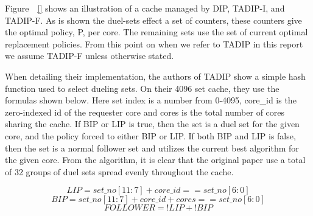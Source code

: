 
Figure~\todo{}~\ref{} shows an illustration of a cache managed by DIP, TADIP-I, and TADIP-F. 
As is shown the duel-sets effect a set of counters, these counters give the optimal policy, P, per core. 
The remaining sets use the set of current optimal replacement policies.
From this point on when we refer to TADIP in this report we assume TADIP-F unless otherwise stated.

When detailing their implementation, the authors of TADIP show a simple hash function used to select dueling sets.
On their 4096 set cache, they use the formulas shown below.
Here set index is a number from 0-4095, core\_id is the zero-indexed id of the requester core and cores is the total number of cores sharing the cache.
If BIP or LIP is true, then the set is a duel set for the given core, and the policy forced to either BIP or LIP.
If both BIP and LIP is false, then the set is a normal follower set and utilizes the current best algorithm for the given core.
From the algorithm, it is clear that the original paper use a total of 32 groups of duel sets spread evenly throughout the cache.
\begin{figure}[ht]
\begin{equation}
LIP = set\_no[11:7] + core\_id == set\_no[6:0]
\end{equation}
\begin{equation}
BIP = set\_no[11:7] + core\_id + cores == set\_no[6:0]
\end{equation}
\begin{equation}
FOLLOWER = !LIP + !BIP
\end{equation}
\end{figure}
